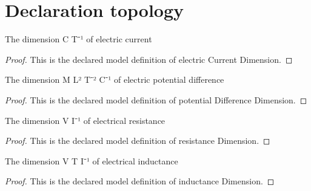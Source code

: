 \section{Declaration topology}
\begin{definition}
  \label{def:physics:phyx-mini-0882:phyxminiproblems-problemphyxmini0882-electriccurrentdimension}
  The dimension C T⁻¹ of electric current
\end{definition}
\begin{proof}
  This is the declared model definition of electric Current Dimension.
\end{proof}
\begin{definition}
  \label{def:physics:phyx-mini-0882:phyxminiproblems-problemphyxmini0882-potentialdifferencedimension}
  The dimension M L² T⁻² C⁻¹ of electric potential difference
\end{definition}
\begin{proof}
  This is the declared model definition of potential Difference Dimension.
\end{proof}
\begin{definition}
  \label{def:physics:phyx-mini-0882:phyxminiproblems-problemphyxmini0882-resistancedimension}
  The dimension V I⁻¹ of electrical resistance
\end{definition}
\begin{proof}
  This is the declared model definition of resistance Dimension.
\end{proof}
\begin{definition}
  \label{def:physics:phyx-mini-0882:phyxminiproblems-problemphyxmini0882-inductancedimension}
  The dimension V T I⁻¹ of electrical inductance
\end{definition}
\begin{proof}
  This is the declared model definition of inductance Dimension.
\end{proof}
